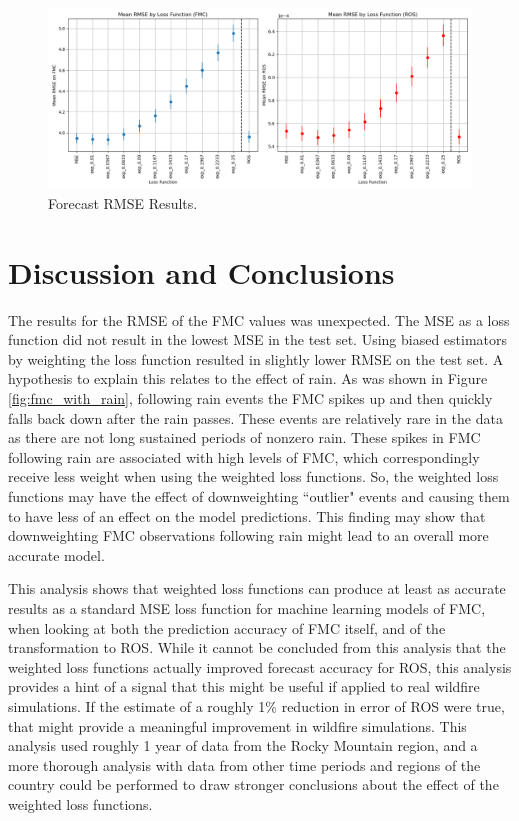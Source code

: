 \documentclass[11pt]{article}%
\begin{document}
\begin{figure}[ht]
    \centering
    \includegraphics[width=1\textwidth]{images/results1.png}
    \caption{Forecast RMSE Results.}
    \label{fig:results1}
\end{figure}

\section{Discussion and Conclusions}

The results for the RMSE of the FMC values was unexpected. The MSE as a loss function did not result in the lowest MSE in the test set. Using biased estimators by weighting the loss function resulted in slightly lower RMSE on the test set. A hypothesis to explain this relates to the effect of rain. As was shown in Figure \ref{fig:fmc_with_rain}, following rain events the FMC spikes up and then quickly falls back down after the rain passes. These events are relatively rare in the data as there are not long sustained periods of nonzero rain. These spikes in FMC following rain are associated with high levels of FMC, which correspondingly receive less weight when using the weighted loss functions. So, the weighted loss functions may have the effect of downweighting ``outlier" events and causing them to have less of an effect on the model predictions. This finding may show that downweighting FMC observations following rain might lead to an overall more accurate model.

This analysis shows that weighted loss functions can produce at least as accurate results as a standard MSE loss function for machine learning models of FMC, when looking at both the prediction accuracy of FMC itself, and of the transformation to ROS. While it cannot be concluded from this analysis that the weighted loss functions actually improved forecast accuracy for ROS, this analysis provides a hint of a signal that this might be useful if applied to real wildfire simulations. If the estimate of a roughly 1\% reduction in error of ROS were true, that might provide a meaningful improvement in wildfire simulations. This analysis used roughly 1 year of data from the Rocky Mountain region, and a more thorough analysis with data from other time periods and regions of the country could be performed to draw stronger conclusions about the effect of the weighted loss functions.
\end{document}
